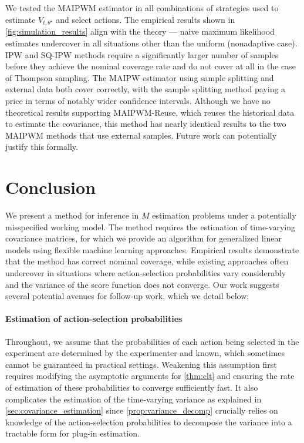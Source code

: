 \documentclass[11pt]{article}
\begin{document}
We tested the MAIPWM estimator in all combinations of strategies used to estimate $V_{t,\theta^{\star}}$ and select actions. The empirical results shown in \cref{fig:simulation_results} align with the theory --- naive maximum likelihood estimates undercover in all situations other than the uniform (nonadaptive case). IPW and SQ-IPW methods require a significantly larger number of samples before they achieve the nominal coverage rate and do not cover at all in the case of Thompson sampling. The MAIPW estimator using sample splitting and external data both cover correctly, with the sample splitting method paying a price in terms of notably wider confidence intervals. Although we have no theoretical results supporting MAIPWM-Reuse, which reuses the historical data to estimate the covariance, this method has nearly identical results to the two MAIPWM methods that use external samples. Future work can potentially justify this formally. 




\section{Conclusion} \label{sec:conclusion}
We present a method for inference in $M$ estimation problems under a potentially misspecified working model. The method requires the estimation of time-varying covariance matrices, for which we provide an algorithm for generalized linear models using flexible machine learning approaches. Empirical results demonstrate that the method has correct nominal coverage, while existing approaches often undercover in situations where action-selection probabilities vary considerably and the variance of the score function does not converge. Our work suggests several potential avenues for follow-up work, which we detail below:

\paragraph{Estimation of action-selection probabilities} Throughout, we assume that the probabilities of each action being selected in the experiment are determined by the experimenter and known, which sometimes cannot be guaranteed in practical settings. Weakening this assumption first requires modifying the asymptotic arguments for \cref{thm:clt} and ensuring the rate of estimation of these probabilities to converge sufficiently fast. It also complicates the estimation of the time-varying variance as explained in \cref{sec:covariance_estimation} since \cref{prop:variance_decomp} crucially relies on knowledge of the action-selection probabilities to decompose the variance into a tractable form for plug-in estimation. 
\end{document}
